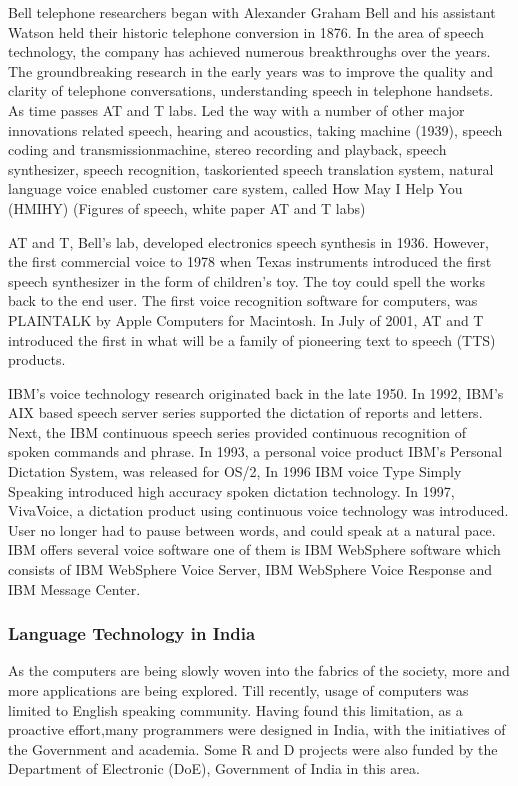 \documentclass[12pt,a4paper,oldfontcommands]{memoir}
\begin{document}
Bell telephone researchers began with Alexander Graham Bell and his assistant
Watson held their historic telephone conversion in 1876. In the area of speech
technology, the company has achieved numerous breakthroughs over the years. The
groundbreaking research in the early years was to improve the quality and clarity of
telephone conversations, understanding speech in telephone handsets. As time passes
AT and T labs. Led the way with a number of other major innovations related speech,
hearing and acoustics, taking machine (1939), speech coding and transmissionmachine, stereo recording and playback, speech synthesizer, speech recognition, taskoriented speech translation system, natural language voice enabled customer care
system, called How May I Help You (HMIHY) (Figures of speech, white paper AT and
T labs)

AT and T, Bell’s lab, developed electronics speech synthesis in 1936. However, the
first commercial voice to 1978 when Texas instruments introduced the first speech
synthesizer in the form of children’s toy. The toy could spell the works back to the
end user. The first voice recognition software for computers, was PLAINTALK by
Apple Computers for Macintosh. In July of 2001, AT and T introduced the first in what
will be a family of pioneering text to speech (TTS) products.

IBM’s voice technology research originated back in the late 1950. In 1992, IBM’s
AIX based speech server series supported the dictation of reports and letters. Next, the
IBM continuous speech series provided continuous recognition of spoken commands
and phrase. In 1993, a personal voice product IBM’s Personal Dictation System, was
released for OS/2, In 1996 IBM voice Type Simply Speaking introduced high
accuracy spoken dictation technology. In 1997, VivaVoice, a dictation product using
continuous voice technology was introduced. User no longer had to pause between
words, and could speak at a natural pace. IBM offers several voice software one of
them is IBM WebSphere software which consists of IBM WebSphere Voice Server,
IBM WebSphere Voice Response and IBM Message Center\cite{10}.

\subsubsection{Language Technology in India}
As the computers are being slowly woven into the fabrics of the society, more and
more applications are being explored. Till recently, usage of computers was limited to
English speaking community. Having found this limitation, as a proactive effort,many programmers were designed in India, with the initiatives of the Government and
academia. Some R and D projects were also funded by the Department of Electronic
(DoE), Government of India in this area.
\end{document}
